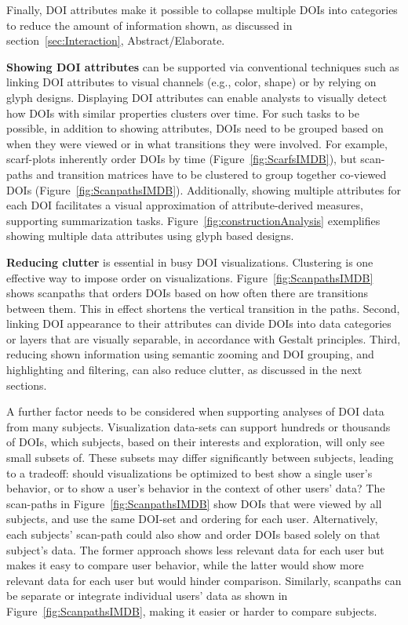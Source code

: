 Finally, DOI attributes make it possible to collapse multiple DOIs into categories to reduce the amount of information shown, as discussed in section~\ref{sec:Interaction}, Abstract/Elaborate.


\noindent \textbf{Showing DOI attributes} can be supported via conventional techniques such as linking DOI attributes to visual channels (e.g., color, shape) or by relying on glyph designs. Displaying DOI attributes can enable analysts to visually detect how DOIs with similar properties clusters over time. For such tasks to be possible, in addition to showing attributes, DOIs need to be grouped based on when they were viewed or in what transitions they were involved. For example, scarf-plots inherently order DOIs by time (Figure~\ref{fig:ScarfsIMDB}), but scan-paths and transition matrices have to be clustered to group together co-viewed DOIs (Figure~\ref{fig:ScanpathsIMDB}). Additionally, showing multiple attributes for each DOI facilitates a visual approximation of attribute-derived measures, supporting summarization tasks. Figure~\ref{fig:constructionAnalysis} exemplifies showing multiple data attributes using glyph based designs. 


\noindent \textbf{Reducing clutter} is essential in busy DOI visualizations. Clustering is one effective way to impose order on visualizations. Figure~\ref{fig:ScanpathsIMDB} shows scanpaths that orders DOIs based on how often there are transitions between them. This in effect shortens the vertical transition in the paths. Second, linking DOI appearance to their attributes can divide DOIs into data categories or layers that are visually separable, in accordance with Gestalt principles. Third, reducing shown information using semantic zooming and DOI grouping, and highlighting and filtering, can also reduce clutter, as discussed in the next sections. 

A further factor needs to be considered when supporting analyses of DOI data from many subjects. Visualization data-sets can support hundreds or thousands of DOIs, which subjects, based on their interests and exploration, will only see small subsets of. These subsets may differ significantly between subjects, leading to a tradeoff: should visualizations be optimized to best show a single user's behavior, or to show a user's behavior in the context of other users' data? The scan-paths in Figure~\ref{fig:ScanpathsIMDB} show DOIs that were viewed by all subjects, and use the same DOI-set and ordering for each user. Alternatively, each subjects' scan-path could also show and order DOIs based solely on that subject's data. The former approach shows less relevant data for each user but makes it easy to compare user behavior, while the latter would show more relevant data for each user but would hinder comparison. Similarly, scanpaths can be separate or integrate individual users' data as shown in Figure~\ref{fig:ScanpathsIMDB}, making it easier or harder to compare subjects.

